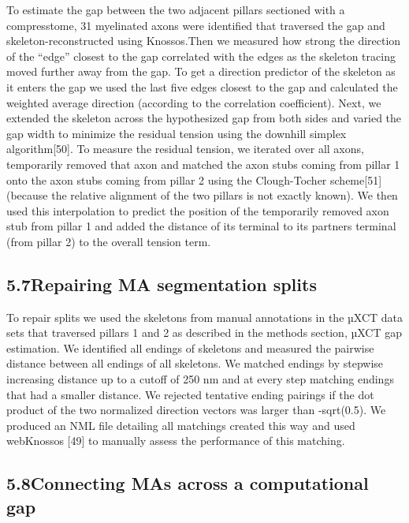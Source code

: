 \documentclass{article}
\begin{document}
To estimate the gap between the two adjacent pillars sectioned with a compresstome, 31 myelinated axons were identified that traversed the gap and skeleton-reconstructed using Knossos.Then we measured how strong the direction of the “edge” closest to the gap correlated with the edges as the skeleton tracing moved further away from the gap. To get a direction predictor of the skeleton as it enters the gap we used the last five edges closest to the gap and calculated the weighted average direction (according to the correlation coefficient). Next, we extended the skeleton across the hypothesized gap from both sides and varied the gap width to minimize the residual tension using the downhill simplex algorithm[50]. To measure the residual tension, we iterated over all axons, temporarily removed that axon and matched the axon stubs coming from pillar 1 onto the axon stubs coming from pillar 2 using the Clough-Tocher scheme[51] (because the relative alignment of the two pillars is not exactly known). We then used this interpolation to predict the position of the temporarily removed axon stub from pillar 1 and added the distance of its terminal to its partners terminal (from pillar 2) to the overall tension term.

\subsection*{5.7\quad Repairing MA segmentation splits}

To repair splits we used the skeletons from manual annotations in the µXCT data sets that traversed pillars 1 and 2 as described in the methods section, µXCT gap estimation. We identified all endings of skeletons and measured the pairwise distance between all endings of all skeletons. We matched endings by stepwise increasing distance up to a cutoff of 250 nm and at every step matching endings that had a smaller distance. We rejected tentative ending pairings if the dot product of the two normalized direction vectors was larger than -sqrt(0.5). We produced an NML file detailing all matchings created this way and used webKnossos [49] to manually assess the performance of this matching.

\subsection*{5.8\quad Connecting MAs across a computational gap}
\end{document}
